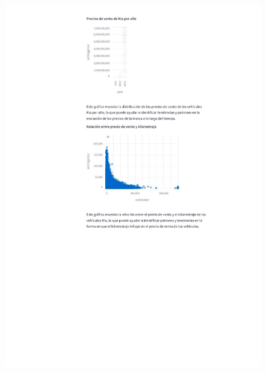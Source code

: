 \begin{anexos}
\begin{figure}
		\includegraphics[height=\textheight]{reporte/6.png}
	\end{figure}
	
	
	\end{anexos}